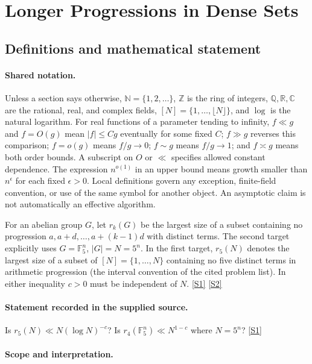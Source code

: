 \documentclass[11pt,a4paper]{article}
\newcommand{\N}{\mathbb{N}}
\newcommand{\Z}{\mathbb{Z}}
\newcommand{\Q}{\mathbb{Q}}
\newcommand{\R}{\mathbb{R}}
\newcommand{\C}{\mathbb{C}}
\newcommand{\F}{\mathbb{F}}
\newcommand{\sref}[2]{\hyperlink{source:#1:#2}{[S#2]}}
\begin{document}
\section{Longer Progressions in Dense Sets}\label{statement}


\subsection{Definitions and mathematical statement}

\paragraph{Shared notation.}Unless a section says otherwise, $\N=\{1,2,\ldots\}$,
$\Z$ is the ring of integers, $\Q,\R,\C$ are the rational, real, and complex
fields, $[N]=\{1,\ldots,\lfloor N\rfloor\}$, and $\log$ is the natural
logarithm. For real functions of a parameter tending to infinity,
$f\ll g$ and $f=O(g)$ mean $|f|\leq Cg$ eventually for some fixed $C$;
$f\gg g$ reverses this comparison; $f=o(g)$ means $f/g\to0$;
$f\sim g$ means $f/g\to1$; and $f\asymp g$ means both order bounds.
A subscript on $O$ or $\ll$ specifies allowed constant dependence.
The expression $n^{o(1)}$ in an upper bound means growth smaller than
$n^\epsilon$ for each fixed $\epsilon>0$. Local definitions govern any
exception, finite-field convention, or use of the same symbol for another
object. An asymptotic claim is not automatically an effective algorithm.



For an abelian group $G$, let $r_k(G)$ be the largest size of a subset containing no progression $a,a+d,\ldots,a+(k-1)d$ with distinct terms. The second target explicitly uses $G=\F_5^n$, $|G|=N=5^n$. In the first target, $r_5(N)$ denotes the largest size of a subset of $[N]=\{1,\ldots,N\}$ containing no five distinct terms in arithmetic progression (the interval convention of the cited problem list). In either inequality $c>0$ must be independent of $N$. \sref{statement}{1} \sref{statement}{2}

\paragraph{Statement recorded in the supplied source.}
Is $r_5(N) \ll N(\log N)^{-c}$? Is $r_4(\mathbb{F}_5^n) \ll N^{1-c}$ where $N = 5^n$? \sref{statement}{1}

\paragraph{Scope and interpretation.}
\end{document}
